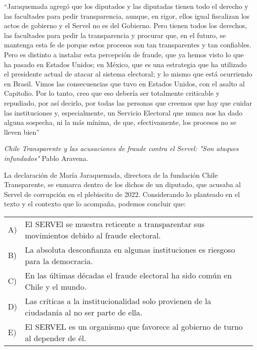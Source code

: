\documentclass[letterpaper,11pt]{article}
\newcommand{\anchopregunta}{0.9\textwidth}
\begin{document}
\begin{enumerate}
\begin{minipage}{\anchopregunta}
\item ``Jaraquemada agregó que los diputados y las diputadas tienen todo el derecho y las facultades para pedir transparencia, aunque, en rigor, ellos igual fiscalizan los actos de gobierno y el Servel no es del Gobierno. Pero tienen todos los derechos, las facultades para pedir la transparencia y procurar que, en el futuro, se mantenga esta fe de porque estos procesos son tan transparentes y tan confiables. Pero es distinto a instalar esta percepción de fraude, que ya hemos visto lo que ha pasado en Estados Unidos; en México, que es una estrategia que ha utilizado el presidente actual de atacar al sistema electoral; y lo mismo que está ocurriendo en Brasil. Vimos las consecuencias que tuvo en Estados Unidos, con el asalto al Capitolio. Por lo tanto, creo que eso debería ser totalmente criticable y repudiado, por así decirlo, por todas las personas que creemos que hay que cuidar las instituciones y, especialmente, un Servicio Electoral que nunca nos ha dado alguna sospecha, ni la más mínima, de que, efectivamente, los procesos no se lleven bien''
\begin{flushright}
\textit{Chile Transparente y las acusaciones de fraude contra el Servel: "Son ataques infundados"} Pablo Aravena.
\end{flushright}
La declaración de María Jaraquemada, directora de la fundación Chile Transparente, se enmarca dentro de los dichos de un diputado, que acusaba al Servel de corrupción en el plebiscito de 2022. Considerando lo planteado en el texto y el contexto que lo acompaña, podemos concluir que:
\begin{flushleft}\begin{tabular}{@{\hspace{-.001\textwidth}}l@{\hspace{2pt}}p{}}
A)& El SERVEl se muestra reticente a transparentar sus movimientos debido al fraude electoral.\\
B)& La absoluta desconfianza en algunas instituciones es riesgoso para la democracia.\\
C)& En las últimas décadas el fraude electoral ha sido común en Chile y el mundo.\\
D)& Las críticas a la institucionalidad solo provienen de la ciudadanía al no ser parte de ella.\\
E)& El SERVEL es un organismo que favorece al gobierno de turno al depender de él.\\ 
\end{tabular}\end{flushleft}%

\end{minipage}
\end{enumerate}
\end{document}
